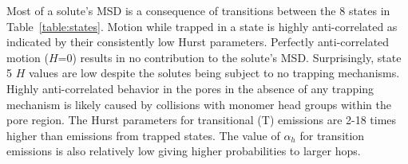 \documentclass{article}
\begin{document}

  Most of a solute's MSD is a consequence of transitions between the 8 states
  in Table~\ref{table:states}. Motion while trapped in a state is highly 
  anti-correlated as indicated by their consistently low Hurst parameters.
  Perfectly anti-correlated motion ($H$=0) results in no contribution to the solute's
  MSD. Surprisingly, state 5 $H$ values are low despite the solutes being subject to no
  trapping mechanisms. Highly anti-correlated behavior in the pores in the absence of
  any trapping mechanism is likely caused by collisions with monomer head groups 
  within the pore region. The Hurst parameters for transitional (T) emissions are 2-18 times higher 
  than emissions from trapped states. The value of $\alpha_h$ for transition 
  emissions is also relatively low giving higher probabilities to larger hops.
  
\end{document}
